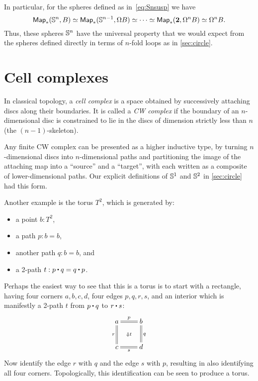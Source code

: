 In particular, for the spheres defined as in~\eqref{eq:Snsusp} we have
\[ \mathsf{Map}_*(\mathbb{S}^n,B) \simeq \mathsf{Map}_*(\mathbb{S}^{n-1}, \Omega B) \simeq \cdots \simeq \mathsf{Map}_*(\mathbf{2},\Omega^n B) \simeq \Omega^n B. \]
Thus, these spheres $\mathbb{S}^n$ have the universal property that we would expect from the spheres defined directly in terms of $n$-fold loops as in \autoref{sec:circle}.


\section{Cell complexes}
\label{sec:cell-complexes}

In classical topology, a \emph{cell complex} is a space obtained by successively attaching discs along their boundaries.
It is called a \emph{CW complex} if the boundary of an $n$-dimensional disc is constrained to lie in the discs of dimension strictly less than $n$ (the $(n-1)$-skeleton).

Any finite CW complex can be presented as a higher inductive type, by turning $n$-dimensional discs into $n$-dimensional paths and partitioning the image of the attaching map into a ``source'' and a ``target'', with each written as a composite of lower-dimensional paths.
Our explicit definitions of $\mathbb{S}^1$ and $\mathbb{S}^2$ in \autoref{sec:circle} had this form.

Another example is the torus $T^2$, which is generated by:
\begin{itemize}
\item a point $b:T^2$,
\item a path $p:b=b$,
\item another path $q:b=b$, and
\item a 2-path $t: p\ct q = q \ct p$.
\end{itemize}
Perhaps the easiest way to see that this is a torus is to start with a rectangle, having four corners $a,b,c,d$, four edges $p,q,r,s$, and an interior which is manifestly a 2-path $t$ from $p\ct q$ to $r\ct s$:
\begin{equation*}
  \vcenter{\xymatrix{
      a\ar@{=}[r]^p\ar@{=}[d]_r \ar@{}[dr]|{\Downarrow t} &
      b\ar@{=}[d]^q\\
      c\ar@{=}[r]_s &
      d
      }}
\end{equation*}
Now identify the edge $r$ with $q$ and the edge $s$ with $p$, resulting in also identifying all four corners.
Topologically, this identification can be seen to produce a torus.

